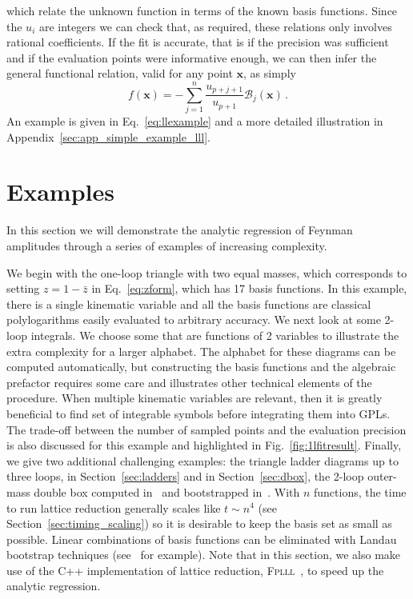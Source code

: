 \documentclass[a4paper,11pt]{article}
\newcommand{\zb}{\bar{z}}
\begin{document}
    which relate the unknown function in terms of the known basis functions. Since the $u_i$ are integers we can check that, as required, these relations only involves rational coefficients. If the fit is accurate, that is if the precision was sufficient and if the evaluation points were informative enough, we can then infer the general functional relation, valid for any point $\mathbf{x}$, as simply
\begin{equation}
    f(\mathbf{x})= - \sum_{j=1}^{n} \frac{u_{p+j+1}}{u_{p+1}} \mathcal{B}_j(\mathbf{x}) \,.
\end{equation}
An example is given in Eq.~\eqref{eq:llexample} and a more detailed illustration in Appendix~\ref{sec:app_simple_example_lll}.

\section{Examples}\label{sec:simple_integrals}
In this section we will demonstrate the analytic regression of Feynman amplitudes through a series of examples of increasing complexity.
  
We begin with the one-loop triangle with two equal masses, which corresponds to setting $z=1-\zb$ in Eq.~\eqref{eq:zform}, which has 17 basis functions.  In this example, there is a single kinematic variable and all the basis functions are classical polylogarithms easily evaluated to arbitrary accuracy.
We next look at some 2-loop integrals. We choose some that are functions of 2 variables to illustrate the extra complexity for a larger alphabet. The alphabet for these diagrams can be computed automatically, but constructing the basis functions and the algebraic prefactor requires some care and illustrates other technical elements of the procedure.
When multiple kinematic variables are relevant, then it is greatly beneficial to find set of integrable symbols before integrating them into GPLs. 
The trade-off between the number of sampled points and the evaluation precision is also discussed for this example and highlighted in Fig.~\ref{fig:1lfitresult}. 
Finally, we give two additional challenging examples: the triangle ladder diagrams up to three loops, in Section~\ref{sec:ladders} and in Section~\ref{sec:dbox}, the 2-loop outer-mass double box computed in~\cite{Caron-Huot:2014lda} and bootstrapped in~\cite{Hannesdottir:2024hke}.
With $n$ functions, the time to run lattice reduction generally scales like $t\sim n^4$ (see Section~\ref{sec:timing_scaling}) so it is desirable to keep the basis set as small as possible.
Linear combinations of basis functions can be eliminated with Landau bootstrap techniques (see~\cite{Hannesdottir:2024hke} for example). Note that in this section, we also make use of the C++ implementation of lattice reduction, \textsc{Fplll}~\cite{fplll}, to speed up the analytic regression. 
\end{document}
